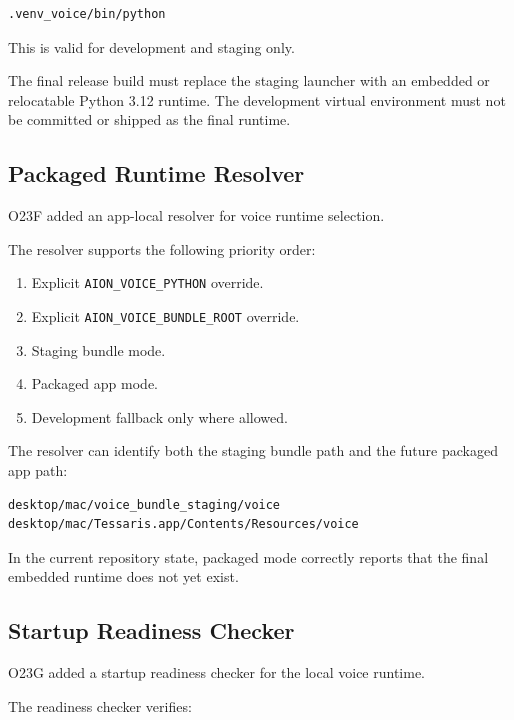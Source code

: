 \begin{verbatim}
.venv_voice/bin/python
\end{verbatim}

This is valid for development and staging only.

The final release build must replace the staging launcher with an embedded or relocatable Python 3.12 runtime. The development virtual environment must not be committed or shipped as the final runtime.

\subsection{Packaged Runtime Resolver}

O23F added an app-local resolver for voice runtime selection.

The resolver supports the following priority order:

\begin{enumerate}
  \item Explicit \texttt{AION\_VOICE\_PYTHON} override.
  \item Explicit \texttt{AION\_VOICE\_BUNDLE\_ROOT} override.
  \item Staging bundle mode.
  \item Packaged app mode.
  \item Development fallback only where allowed.
\end{enumerate}

The resolver can identify both the staging bundle path and the future packaged app path:

\begin{verbatim}
desktop/mac/voice_bundle_staging/voice
desktop/mac/Tessaris.app/Contents/Resources/voice
\end{verbatim}

In the current repository state, packaged mode correctly reports that the final embedded runtime does not yet exist.

\subsection{Startup Readiness Checker}

O23G added a startup readiness checker for the local voice runtime.

The readiness checker verifies:


